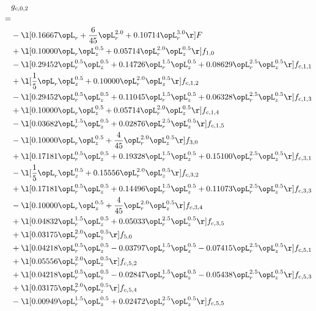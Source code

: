 \begin{alignat}{2} 
\label{eq:g_02_0} 
& g_{c,0,2} \nonumber \\ 
 = \\ 
& - \l[  0.16667 \opL_r + \frac{6}{45} \opL_r^{2.0} +  0.10714 \opL_r^{3.0}  \r] F \nonumber \\ 
& + \l[  0.10000 \opL_r \opL_z^{0.5} +  0.05714 \opL_r^{2.0} \opL_z^{0.5}  \r] f_{1,0} \nonumber \\ 
& - \l[  0.29452 \opL_r^{0.5} \opL_z^{0.5} +  0.14726 \opL_r^{1.5} \opL_z^{0.5} +  0.08629 \opL_r^{2.5} \opL_z^{0.5}  \r] f_{c,1,1} \nonumber \\ 
& + \l[ \frac{1}{5} \opL_r \opL_z^{0.5} +  0.10000 \opL_r^{2.0} \opL_z^{0.5}  \r] f_{c,1,2} \nonumber \\ 
& - \l[  0.29452 \opL_r^{0.5} \opL_z^{0.5} +  0.11045 \opL_r^{1.5} \opL_z^{0.5} +  0.06328 \opL_r^{2.5} \opL_z^{0.5}  \r] f_{c,1,3} \nonumber \\ 
& + \l[  0.10000 \opL_r \opL_z^{0.5} +  0.05714 \opL_r^{2.0} \opL_z^{0.5}  \r] f_{c,1,4} \nonumber \\ 
& - \l[  0.03682 \opL_r^{1.5} \opL_z^{0.5} +  0.02876 \opL_r^{2.5} \opL_z^{0.5}  \r] f_{c,1,5} \nonumber \\ 
& - \l[  0.10000 \opL_r \opL_z^{0.5} + \frac{4}{45} \opL_r^{2.0} \opL_z^{0.5}  \r] f_{3,0} \nonumber \\ 
& + \l[  0.17181 \opL_r^{0.5} \opL_z^{0.5} +  0.19328 \opL_r^{1.5} \opL_z^{0.5} +  0.15100 \opL_r^{2.5} \opL_z^{0.5}  \r] f_{c,3,1} \nonumber \\ 
& - \l[ \frac{1}{5} \opL_r \opL_z^{0.5} +  0.15556 \opL_r^{2.0} \opL_z^{0.5}  \r] f_{c,3,2} \nonumber \\ 
& + \l[  0.17181 \opL_r^{0.5} \opL_z^{0.5} +  0.14496 \opL_r^{1.5} \opL_z^{0.5} +  0.11073 \opL_r^{2.5} \opL_z^{0.5}  \r] f_{c,3,3} \nonumber \\ 
& - \l[  0.10000 \opL_r \opL_z^{0.5} + \frac{4}{45} \opL_r^{2.0} \opL_z^{0.5}  \r] f_{c,3,4} \nonumber \\ 
& + \l[  0.04832 \opL_r^{1.5} \opL_z^{0.5} +  0.05033 \opL_r^{2.5} \opL_z^{0.5}  \r] f_{c,3,5} \nonumber \\ 
& + \l[  0.03175 \opL_r^{2.0} \opL_z^{0.5}  \r] f_{5,0} \nonumber \\ 
& + \l[  0.04218 \opL_r^{0.5} \opL_z^{0.5}   -0.03797 \opL_r^{1.5} \opL_z^{0.5}   -0.07415 \opL_r^{2.5} \opL_z^{0.5}  \r] f_{c,5,1} \nonumber \\ 
& + \l[  0.05556 \opL_r^{2.0} \opL_z^{0.5}  \r] f_{c,5,2} \nonumber \\ 
& + \l[  0.04218 \opL_r^{0.5} \opL_z^{0.5}   -0.02847 \opL_r^{1.5} \opL_z^{0.5}   -0.05438 \opL_r^{2.5} \opL_z^{0.5}  \r] f_{c,5,3} \nonumber \\ 
& + \l[  0.03175 \opL_r^{2.0} \opL_z^{0.5}  \r] f_{c,5,4} \nonumber \\ 
& - \l[  0.00949 \opL_r^{1.5} \opL_z^{0.5} +  0.02472 \opL_r^{2.5} \opL_z^{0.5}  \r] f_{c,5,5} \nonumber \\ 
\end{alignat} 


